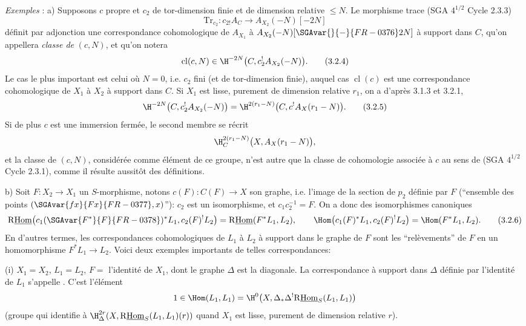 \emph{Exemples} : a) Supposons $c$ propre et $c_2$ de tor-dimension finie et de dimension relative $\leq N$. Le morphisme trace (SGA $4^{1/2}$ Cycle 2.3.3)
\[
\mathrm{Tr}_{c_2}:c_{2!}A_C\longrightarrow A_{X_2}(-N)[-2N]
\]
définit par adjonction une correspondance cohomologique de $A_{X_1}$ à $A_{X_2}(-N)[\SGAvar{}{-}{FR-0376}2N]$ 
à
support dans $C$, qu'on appellera \emph{classe de} $(c,N)$, et qu'on notera
\begin{equation}
\operatorname{cl}(c,N)\in \H^{-2N}\bigl(C,c_2^!A_{X_2}(-N)\bigr).
\tag{3.2.4}
\end{equation}
Le cas le plus important est celui où $N=0$, i.e. $c_2$ fini (et de tor-dimension finie), auquel cas $\operatorname{cl}(c)$ est une correspondance cohomologique de $X_1$ à $X_2$ à support dans $C$. Si $X_1$ est lisse, purement de dimension relative $r_1$, on a d'après 3.1.3 et 3.2.1,
\begin{equation}
\H^{-2N}\bigl(C,c_2^!A_{X_2}(-N)\bigr)
=
\H^{2(r_1-N)}\bigl(C,c^!A_X(r_1-N)\bigr).
\tag{3.2.5}
\end{equation}
Si de plus $c$ est une immersion fermée, le second membre se récrit
\[
\H^{2(r_1-N)}_C\bigl(X,A_X(r_1-N)\bigr),
\]
et la classe de $(c,N)$, considérée comme élément de ce groupe, n'est autre que la classe de cohomologie associée à $c$ au sens de (SGA $4^{1/2}$ Cycle 2.3.1), comme il résulte aussitôt des définitions.

b) Soit $F:X_2\to X_1$ un $S$-morphisme, notons $c(F):C(F)\to X$ son graphe, i.e. l'image de la section de $p_2$ définie par $F$ (``ensemble des points $(\SGAvar{fx}{Fx}{FR-0377},x)$''): $c_2$ est un isomorphisme, et $c_1c_2^{-1}=F$. On a donc des isomorphismes canoniques
\begin{equation}
\mathrm{R}\underline{\mathrm{Hom}}\bigl(c_1(\SGAvar{F^*}{F}{FR-0378})^*L_1,c_2(F)^!L_2\bigr)=\mathrm{R}\underline{\mathrm{Hom}}(F^*L_1,L_2),
\qquad
\Hom\bigl(c_1(F)^*L_1,c_2(F)^!L_2\bigr)=\Hom(F^*L_1,L_2).
\tag{3.2.6}
\end{equation}
En d'autres termes, les correspondances cohomologiques de $L_1$ à $L_2$ à support dans le graphe de $F$ sont les ``relèvements'' de $F$ en un homomorphisme $F^*L_1\to L_2$. Voici deux exemples importants de telles correspondances:

(i) $X_1=X_2$, $L_1=L_2$, $F=$ l'identité de $X_1$, dont le graphe $\Delta$ est la diagonale. La correspondance à support dans $\Delta$ définie par l'identité de $L_1$ s'appelle . C'est l'élément
\[
1\in \Hom(L_1,L_1)=\H^0\bigl(X,\Delta_*\Delta^!\mathrm{R}\underline{\mathrm{Hom}}_S(L_1,L_1)\bigr)
\]
(groupe qui identifie à 
$\H^{2r}_\Delta(X,\mathrm{R}\underline{\mathrm{Hom}}_S(L_1,L_1)(r))$ quand $X_1$ est lisse, purement de dimension relative $r$).

